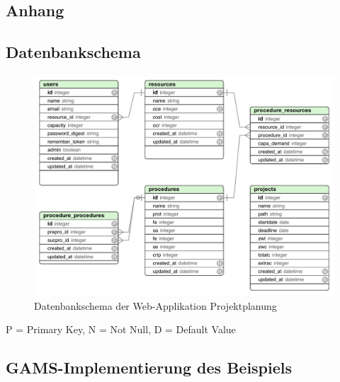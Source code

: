\documentclass[a4paper,12pt,parskip,bibtotoc,liststotoc]{article}
\begin{document}
\newpage

\newpage
%
%
\begin{appendix}
\section{Anhang}

\subsection{Datenbankschema}\label{db-schema}

\begin{figure}[h!]
  \begin{center}
    \includegraphics[width=150mm]{Bilder/DB.pdf}
    \caption{Datenbankschema der Web-Applikation Projektplanung}  \label{schema}
  \end{center}
\end{figure}

P = Primary Key, N = Not Null, D = Default Value

\subsection{GAMS-Implementierung des Beispiels}\label{Imp}
%



\end{appendix}
\end{document}

